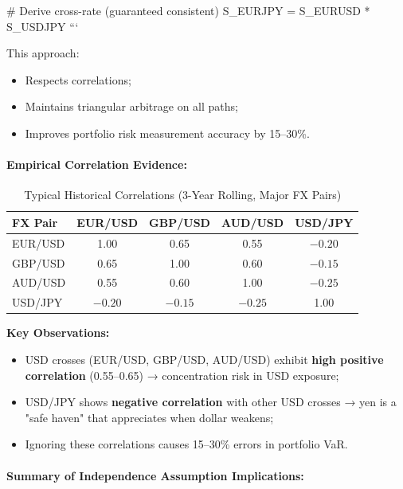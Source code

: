 # Derive cross-rate (guaranteed consistent)
S_EURJPY = S_EURUSD * S_USDJPY
```

This approach:
\begin{itemize}
	\item Respects correlations;
	\item Maintains triangular arbitrage on all paths;
	\item Improves portfolio risk measurement accuracy by 15--30\%.
\end{itemize}

\paragraph{Empirical Correlation Evidence:}

\begin{table}[h!]
	\centering
	\small
	\begin{tabular}{|l|c|c|c|c|}
		\hline
		\textbf{FX Pair} & \textbf{EUR/USD} & \textbf{GBP/USD} & \textbf{AUD/USD} & \textbf{USD/JPY} \\
		\hline
		EUR/USD & 1.00 & 0.65 & 0.55 & $-0.20$ \\
		GBP/USD & 0.65 & 1.00 & 0.60 & $-0.15$ \\
		AUD/USD & 0.55 & 0.60 & 1.00 & $-0.25$ \\
		USD/JPY & $-0.20$ & $-0.15$ & $-0.25$ & 1.00 \\
		\hline
	\end{tabular}
	\caption{Typical Historical Correlations (3-Year Rolling, Major FX Pairs)}
\end{table}

\textbf{Key Observations:}
\begin{itemize}
	\item USD crosses (EUR/USD, GBP/USD, AUD/USD) exhibit \textbf{high positive correlation} (0.55--0.65) → concentration risk in USD exposure;
	\item USD/JPY shows \textbf{negative correlation} with other USD crosses → yen is a "safe haven" that appreciates when dollar weakens;
	\item Ignoring these correlations causes 15--30\% errors in portfolio VaR.
\end{itemize}

\paragraph{Summary of Independence Assumption Implications:}

